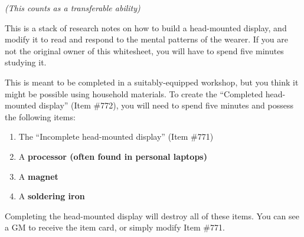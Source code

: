 \documentclass[white]{guildcamp1}
\begin{document}
\name{\wHeadMountedDisplay{}}

\emph{(This counts as a transferable ability)}

This is a stack of research notes on how to build a head-mounted display, and modify it to read and respond to the mental patterns of the wearer. If you are not the original owner of this whitesheet, you will have to spend five minutes studying it.

This is meant to be completed in a suitably-equipped workshop, but you think it might be possible using household materials. To create the ``Completed head-mounted display'' (Item \#772), you will need to spend five minutes and possess the following items:

\begin{enumerate}
\item The  ``Incomplete head-mounted display'' (Item \#771)
\item A \bf{processor} (often found in personal laptops)
\item A \bf{magnet}
\item A \bf{soldering iron}
\end{enumerate}

Completing the head-mounted display will destroy all of these items. You can see a GM to receive the item card, or simply modify Item \#771.
\end{document}

